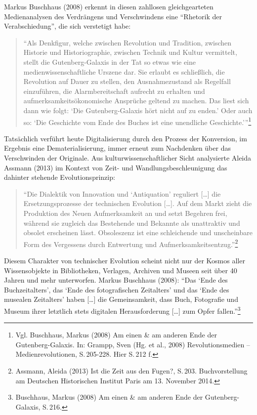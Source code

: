\documentclass[a4paper,
fontsize=11pt,
oneside,
numbers=noperiodatend,
parskip=half-,
bibliography=totoc,
final
]{scrartcl}
\begin{document}
Markus Buschhaus (2008) erkennt in diesen zahllosen gleichgearteten
Medienanalysen des Verdrängens und Verschwindens eine \enquote{Rhetorik
der Verabschiedung}, die sich verstetigt habe:

\begin{quote}
\enquote{Als Denkfigur, welche zwischen Revolution und Tradition,
zwischen Historie und Historiographie, zwischen Technik und Kultur
vermittelt, stellt die Gutenberg-Galaxis in der Tat so etwas wie eine
medienwissenschaftliche Urszene dar. Sie erlaubt es schließlich, die
Revolution auf Dauer zu stellen, den Ausnahmezustand als Regelfall
einzuführen, die Alarmbereitschaft aufrecht zu erhalten und
aufmerksamkeitsökonomische Ansprüche geltend zu machen. Das liest sich
dann wie folgt: \enquote{Die Gutenberg-Galaxis hört nicht auf zu enden.}
Oder auch so: \enquote{Die Geschichte vom Ende des Buches ist eine
unendliche Geschichte.}}\footnote{Vgl. Buschhaus, Markus (2008) Am einen
  \& am anderen Ende der Gutenberg-Galaxis. In: Grampp, Sven (Hg. et
  al., 2008) Revolutionsmedien -- Medienrevolutionen, S.\,205-228. Hier
  S.\,212 f.}
\end{quote}

Tatsächlich verführt heute Digitalisierung durch den Prozess der
Konversion, im Ergebnis eine Dematerialisierung, immer erneut zum
Nachdenken über das Verschwinden der Originale. Aus
kulturwissenschaftlicher Sicht analysierte Aleida Assmann (2013) im
Kontext von Zeit- und Wandlungsbeschleunigung das dahinter stehende
Evolutionsprinzip:

\begin{quote}
\enquote{Die Dialektik von Innovation und \enquote{Antiquation}
reguliert {[}\ldots{}{]} die Ersetzungsprozesse der technischen
Evolution {[}\ldots{}{]}. Auf dem Markt zieht die Produktion des Neuen
Aufmerksamkeit an und setzt Begehren frei, während sie zugleich das
Bestehende und Bekannte als unattraktiv und obsolet erscheinen lässt.
Obsoleszenz ist eine schleichende und unscheinbare Form des Vergessens
durch Entwertung und Aufmerksamkeitsentzug.}\footnote{Assmann, Aleida
  (2013) Ist die Zeit aus den Fugen?, S.\,203. Buchvorstellung am
  Deutschen Historischen Institut Paris am 13. November 2014.}
\end{quote}

Diesem Charakter von technischer Evolution scheint nicht nur der Kosmos
aller Wissensobjekte in Bibliotheken, Verlagen, Archiven und Museen seit
über 40 Jahren und mehr unterworfen. Markus Buschhaus (2008):
\enquote{Das \enquote{Ende des Buchzeitalters}, das \enquote{Ende des
fotografischen Zeitalters} und das \enquote{Ende des musealen
Zeitalters} haben {[}\ldots{}{]} die Gemeinsamkeit, dass Buch,
Fotografie und Museum ihrer letztlich stets digitalen Herausforderung
{[}\ldots{}{]} zum Opfer fallen.}\footnote{Buschhaus, Markus (2008) Am
  einen \& am anderen Ende der Gutenberg-Galaxis, S.\,216.}
\end{document}
